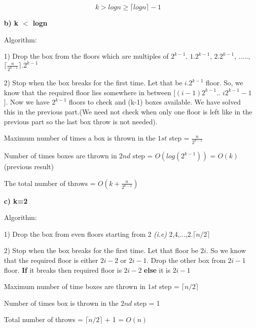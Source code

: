 \documentclass[12pt]{article}
\begin{document}
\begin{enumerate}
    \[ k>logn \geq \lceil logn \rceil -1 \]
    
    \textbf{b) k $<$ logn}
    
    Algorithm:
    
    1) Drop the box from the floors which are multiples of $2^{k-1}$. $1.2^{k-1}$, $2.2^{k-1}$, ....., $\lceil \frac{n}{2^{k-1}} \rceil.2^{k-1}$
    
    2) Stop when the box breaks for the first time. Let that be $i.2^{k-1}$ floor. So, we know that the required floor lies somewhere in between [$(i-1)2^{k-1}$.. $i2^{k-1}-1$]. Now we have $2^{k-1}$ floors to check and (k-1) boxes available. We have solved this in the previous part.(We need not check when only one floor is left like in the previous part so the last box throw is not needed).
    
    Maximum number of times a box is thrown in the $1st$ step = $\frac{n}{2^{k-1}}$
    
    Number of times boxes are thrown in $2nd$ step = $O(log(2^{k-1}))$ = $O(k)$ (previous result)
    
    The total number of throws = $O(k+\frac{n}{2^{k-1}})$
    
    \textbf{c) k=2}
    
    Algorithm:
    
    1) Drop the box from even floors starting from 2 \textit{(i.e)} 2,4,...,2.$\lceil n/2 \rceil$
    
    2) Stop when the box breaks for the first time. Let that floor be $2i$. So we know that the required floor is either $2i-2$ or $2i-1$. Drop the other box from $2i-1$ floor. \textbf{If} it breaks then required floor is $2i-2$ \textbf{else} it is $2i-1$
    
    Maximum number of time boxes are thrown in $1st$ step = $\lceil n/2 \rceil$
    
    Number of times box is thrown in the $2nd$ step = 1
    
    Total number of throws = $\lceil n/2 \rceil$ + 1 = $O(n)$
        

\end{enumerate}
\end{document}
